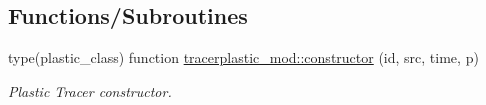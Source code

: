 \subsection*{Functions/\+Subroutines}
\begin{DoxyCompactItemize}
\item 
type(plastic\+\_\+class) function \mbox{\hyperlink{namespacetracerplastic__mod_ae68444b860b6e7abf3940b0ee1bfe57a}{tracerplastic\+\_\+mod\+::constructor}} (id, src, time, p)
\begin{DoxyCompactList}\small\item\em Plastic Tracer constructor. \end{DoxyCompactList}\end{DoxyCompactItemize}
